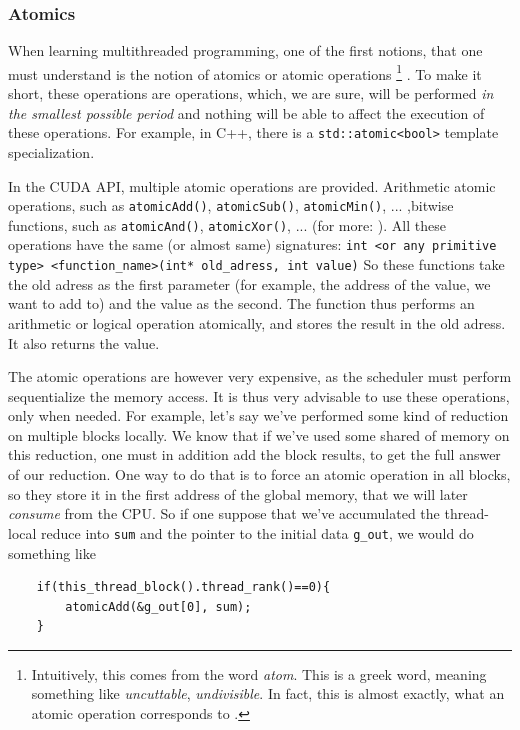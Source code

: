 \documentclass[12pt]{article}
\begin{document}
\subsubsection*{Atomics}
When learning multithreaded programming, one of the first notions, that one must understand
is the notion of atomics or atomic operations \footnote{Intuitively, 
this comes from the word \textit{atom}. This is a greek word, meaning something 
like \textit{uncuttable}, \textit{undivisible}. In fact, this is almost exactly, what an atomic operation corresponds to 
\cite{atomics} .}
. To make it short, these operations are operations, which, we are sure, will be performed \textit{in the smallest possible
period} and nothing will be able to affect the execution of these operations.
For example, in C++, there is a \verb|std::atomic<bool>| template specialization. 


In the CUDA API, multiple atomic operations are provided. Arithmetic atomic operations, 
such as \verb|atomicAdd()|, \verb|atomicSub()|, \verb|atomicMin()|, ... 
,bitwise functions, such as \verb|atomicAnd()|, \verb|atomicXor()|, ...
(for more: \cite{center}).
All these operations have the same (or almost same) signatures: 
\verb|int <or any primitive type> <function_name>(int* old_adress, int value)|
So these functions take the old adress as the first parameter (for example, the address of the value, we want to add to) and 
the value as the second. The function thus performs an arithmetic or logical operation atomically, 
and stores the result in the old adress. It also returns the value.


The atomic operations are however very expensive, as the scheduler must perform sequentialize the memory access. 
It is thus very advisable to use these operations, only when needed.
For example, let's say we've performed some kind of reduction on multiple blocks locally. 
We know that if we've used some shared of memory on this reduction, one must in addition add the block results, to 
get the full answer of our reduction. One way to do that is to force an atomic operation in all blocks, so they store it 
in the first address of the global memory, that we will later \textit{consume} from the CPU. 
So if one  suppose that we've accumulated the thread-local reduce into \verb|sum| and the pointer to the 
initial data \verb|g_out|, we would do something like

\begin{verbatim}
    if(this_thread_block().thread_rank()==0){
        atomicAdd(&g_out[0], sum);
    }
\end{verbatim}
\end{document}

